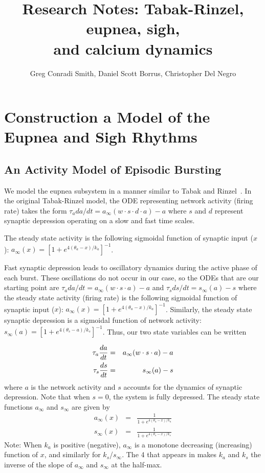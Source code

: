 \documentclass[12pt]{article}
\title{Research Notes: Tabak-Rinzel, eupnea, sigh,\\  and calcium dynamics}
\author{Greg Conradi Smith, Daniel Scott Borrus, Christopher Del Negro }
\def\w{w}
\def\taus{\tau_s}
\def\thetaa{\theta_a}
\def\ka{k_a}
\def\thetas{\theta_s}
\def\ks{k_s}
\def\ainf{a_\infty}
\def\sinf{s_\infty}
\begin{document}
\maketitle

\section{Construction a Model of the Eupnea and Sigh Rhythms}

\subsection{An Activity Model of Episodic Bursting}

We model the eupnea subsystem in a manner similar to Tabak and Rinzel~\citeyearpar{TabakRinzel05}.  In the original Tabak-Rinzel model, the ODE representing network activity (firing rate) takes the form $\tau_a da/dt = \ainf (\w \cdot s \cdot d \cdot a) - a$ where $s$ and $d$ represent synaptic depression operating on a slow and fast time scales. 

The steady state activity is the following sigmoidal function of synaptic input ($x$): $\ainf(x) =  [1+e^{4(\thetaa-x)/\ka}]^{-1}$. 


Fast synaptic depression leads to oscillatory dynamics during the active phase of each burst.  These oscillations do not occur in our case, so 
the ODEs that are our starting point are
$\tau_a da/dt = \ainf (\w \cdot s \cdot a) - a$ and $
\taus ds/dt = \sinf (a) - s$ where the steady state activity (firing rate) is the following sigmoidal function of synaptic input ($x$): $\ainf(x) =  [1+e^{4(\thetaa-x)/\ka}]^{-1}$.  Similarly, the steady state synaptic depression is a sigmoidal function of network activity: $\sinf(a) =  [1+e^{4(\thetas-a)/\ks}]^{-1}$. Thus, our two state variables can be written 

\begin{eqnarray}
\tau_a \ddt{a} &=& \ainf (\w \cdot s \cdot a) - a\label{ODEa} \\
\taus \ddt{s} &=& \sinf (a) - s  \label{ODEs} 
\end{eqnarray}
where $a$ is the network activity and $s$ accounts for the dynamics of synaptic depression. Note that when $s=0$, the system is fully depressed.
The steady state functions $\ainf$ and $\sinf$ are given by 
\begin{eqnarray}
\ainf(x) &=& \frac{1}{1+e^{4(\thetaa-x)/\ka}}  \label{SQUASHA} \\
\sinf(x) &=& \frac{1}{1+e^{4(\thetas-x)/\ks}}  \label{SQUASHS} 
\end{eqnarray}
Note: When $\ka$ is positive (negative), $\ainf$ is a monotone decreasing (increasing) function of $x$, and similarly for $\ks$/$\sinf$.   The 4 that appears  in  makes $\ka$ and $\ks$ the inverse of the slope of $\ainf$ and $\sinf$ at the half-max.  
\end{document}
